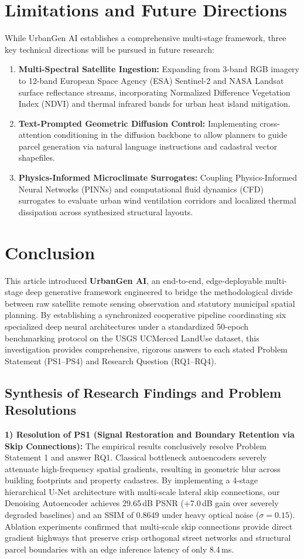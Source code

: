\documentclass[journal]{IEEEtran}
\begin{document}
\section{Limitations and Future Directions}
While UrbanGen AI establishes a comprehensive multi-stage framework, three key technical directions will be pursued in future research:
\begin{enumerate}
    \item \textbf{Multi-Spectral Satellite Ingestion:} Expanding from 3-band RGB imagery to 12-band European Space Agency (ESA) Sentinel-2 and NASA Landsat surface reflectance streams, incorporating Normalized Difference Vegetation Index (NDVI) and thermal infrared bands for urban heat island mitigation.
    \item \textbf{Text-Prompted Geometric Diffusion Control:} Implementing cross-attention conditioning in the diffusion backbone to allow planners to guide parcel generation via natural language instructions and cadastral vector shapefiles.
    \item \textbf{Physics-Informed Microclimate Surrogates:} Coupling Physics-Informed Neural Networks (PINNs) and computational fluid dynamics (CFD) surrogates to evaluate urban wind ventilation corridors and localized thermal dissipation across synthesized structural layouts.
\end{enumerate}

\section{Conclusion}
This article introduced \textbf{UrbanGen AI}, an end-to-end, edge-deployable multi-stage deep generative framework engineered to bridge the methodological divide between raw satellite remote sensing observation and statutory municipal spatial planning. By establishing a synchronized cooperative pipeline coordinating six specialized deep neural architectures under a standardized 50-epoch benchmarking protocol on the USGS UCMerced LandUse dataset, this investigation provides comprehensive, rigorous answers to each stated Problem Statement (PS1--PS4) and Research Question (RQ1--RQ4).

\subsection{Synthesis of Research Findings and Problem Resolutions}
\noindent\textbf{1) Resolution of PS1 (Signal Restoration and Boundary Retention via Skip Connections):}
The empirical results conclusively resolve Problem Statement 1 and answer RQ1. Classical bottleneck autoencoders severely attenuate high-frequency spatial gradients, resulting in geometric blur across building footprints and property cadastres. By implementing a 4-stage hierarchical U-Net architecture with multi-scale lateral skip connections, our Denoising Autoencoder achieves 29.65\,dB PSNR (+7.0\,dB gain over severely degraded baselines) and an SSIM of 0.8649 under heavy optical noise ($\sigma = 0.15$). Ablation experiments confirmed that multi-scale skip connections provide direct gradient highways that preserve crisp orthogonal street networks and structural parcel boundaries with an edge inference latency of only 8.4\,ms.
\end{document}
